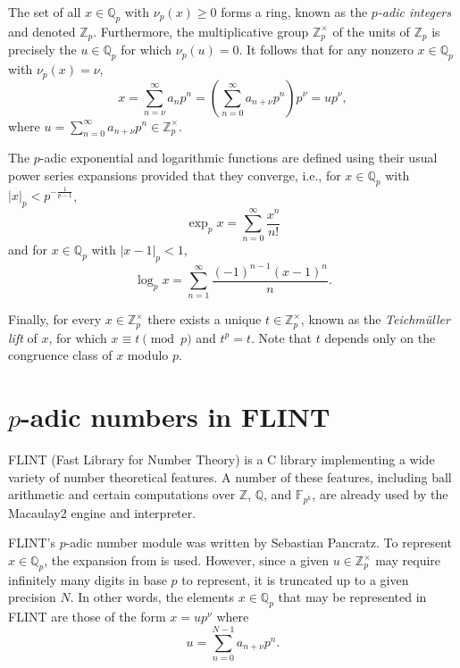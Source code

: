 \documentclass[runningheads]{llncs}
\newcommand{\FF}{\mathbb F}
\newcommand{\QQ}{\mathbb Q}
\newcommand{\ZZ}{\mathbb Z}
\begin{document}
The set of all $x\in\QQ_p$ with $\nu_p(x)\geq 0$ forms a ring, known as the \textit{$p$-adic integers} and denoted $\ZZ_p$.  Furthermore, the multiplicative group $\ZZ_p^\times$ of the units of $\ZZ_p$ is precisely the $u\in\QQ_p$ for which $\nu_p(u) = 0$.  It follows that for any nonzero $x\in\QQ_p$ with $\nu_p(x)=\nu$,
\begin{equation}\label{in terms of unit}
  x = \sum_{n=\nu}^\infty a_n p^n = \left(\sum_{n=0}^\infty a_{n + \nu}p^n\right)p^\nu = up^\nu,
\end{equation}
where $u=\sum\limits_{n=0}^\infty a_{n + \nu}p^n\in\ZZ_p^\times$.

The $p$-adic exponential and logarithmic functions are defined using their usual power series expansions provided that they converge, i.e., for $x\in\QQ_p$ with $|x|_p < p^{-\frac{1}{p-1}}$,
\begin{equation*}
  \exp_p x = \sum_{n=0}^\infty\frac{x^n}{n!}
\end{equation*}
and for $x\in\QQ_p$ with $|x-1|_p < 1$,
\begin{equation*}
  \log_p x = \sum_{n=1}^\infty\frac{(-1)^{n-1}(x-1)^n}{n}.
\end{equation*}

Finally, for every $x\in\ZZ_p^\times$ there exists a unique $t\in\ZZ_p^\times$, known as the \textit{Teichm\"uller lift} of $x$, for which $x\equiv t\pmod p$ and $t^p = t$.  Note that $t$ depends only on the congruence class of $x$ modulo $p$.

\section{$p$-adic numbers in FLINT}\label{flint p-adic module}

FLINT (Fast Library for Number Theory) \cite{flint} is a C library implementing a wide variety of number theoretical features.  A number of these features, including ball arithmetic and certain computations over $\ZZ$, $\QQ$, and $\FF_{p^k}$, are already used by the Macaulay2 engine and interpreter.

FLINT's $p$-adic number module was written by Sebastian Pancratz.  To represent $x\in\QQ_p$, the expansion from  is used.  However, since a given $u\in\ZZ_p^\times$ may require infinitely many digits in base $p$ to represent, it is truncated up to a given precision $N$.  In other words, the elements $x\in\QQ_p$ that may be represented in FLINT are those of the form $x = up^\nu$ where
\begin{equation}\label{p-adic with precision}
  u = \sum_{n = 0}^{N-1}a_{n+\nu}p^n.
\end{equation}
\end{document}

